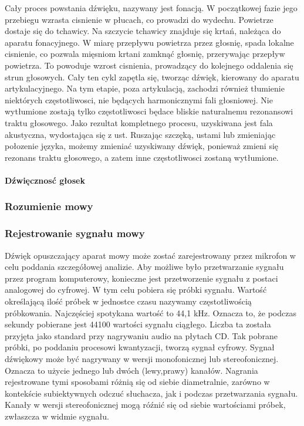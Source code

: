 \documentclass[a4paper,12 pt]{article}
\begin{document}
Cały proces powstania dźwięku, nazywany jest fonacją. W początkowej fazie jego przebiegu wzrasta cisnienie w płucach, co prowadzi do wydechu. Powietrze dostaje się do tchawicy. Na szczycie tchawicy znajduje się krtań, należąca do aparatu fonacyjnego. W miarę przepływu powietrza przez głosnię, spada lokalne cisnienie, co pozwala mięsniom krtani zamknąć głosnię, przerywając przepływ powietrza. To powoduje wzrost cisnienia, prowadzący do kolejnego oddalenia się strun głosowych. Cały ten cykl zapętla się, tworząc dźwięk, kierowany do aparatu artykulacyjnego. Na tym etapie, poza artykulacją, zachodzi również tłumienie niektórych częstotliwosci, nie będących harmonicznymi fali głosniowej. Nie wytłumione zostają tylko częstotliwosci będace bliskie naturalnemu rezonansowi traktu głosowego. Jako rezultat kompletnego procesu, uzyskiwana jest fala akustyczna, wydostająca się z ust. Ruszając szczęką, ustami lub zmieniając połozenie języka, możemy zmieniać uzyskiwany dźwięk, ponieważ zmieni się rezonans traktu głosowego, a zatem inne częstotliwosci zostaną wytłumione.

\paragraph{Dźwięcznosć głosek}
\subsubsection{Rozumienie mowy}
\subsubsection{Rejestrowanie sygnału mowy}

Dźwięk opuszczający aparat mowy może zostać zarejestrowany przez mikrofon w celu poddania szczegółowej analizie. Aby możliwe było przetwarzanie sygnału przez program komputerowy, konieczne jest przetworzenie sygnału z postaci analogowej do cyfrowej. W tym celu pobiera się próbki sygnału. Wartość określającą ilość próbek w jednostce czasu nazywamy częstotliwością próbkowania. Najczęściej spotykana wartość to 44,1 kHz. Oznacza to, że podczas sekundy pobierane jest 44100 wartości sygnału ciągłego. Liczba ta została przyjęta jako standard przy nagrywaniu audio na płytach CD. Tak pobrane próbki, po poddaniu procesowi kwantyzacji, tworzą sygnał cyfrowy.
Sygnał dźwiękowy może być nagrywany w wersji monofonicznej lub stereofonicznej. Oznacza to użycie jednego lub dwóch (lewy,prawy) kanałów. Nagrania rejestrowane tymi sposobami różnią się od siebie diametralnie, zarówno w kontekście subiektywnych odczuć słuchacza, jak i podczas przetwarzania sygnału. Kanały w wersji stereofonicznej mogą róźnić się od siebie wartościami próbek, zwłaszcza w widmie sygnału.
\end{document}
